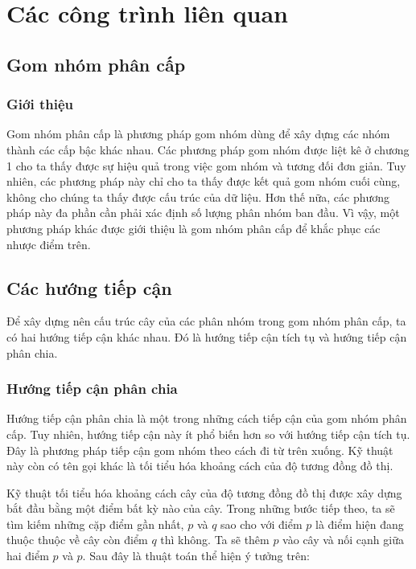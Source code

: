 \chapter{Các công trình liên quan}
\label{Chapter2}

\section{Gom nhóm phân cấp}
\subsection{Giới thiệu}
Gom nhóm phân cấp là phương pháp gom nhóm dùng để xây dựng các nhóm thành các cấp bậc khác nhau.
Các phương pháp gom nhóm được liệt kê ở chương 1 cho ta thấy được sự hiệu quả trong việc gom nhóm và tương đối đơn giản.
Tuy nhiên, các phương pháp này chỉ cho ta thấy được kết quả gom nhóm cuối cùng, không cho chúng ta thấy được cấu trúc của dữ liệu.
Hơn thế nữa, các phương pháp này đa phần cần phải xác định số lượng phân nhóm ban đầu.
Vì vậy, một phương pháp khác được giới thiệu là gom nhóm phân cấp để khắc phục các nhược điểm trên.

\section{Các hướng tiếp cận}
Để xây dựng nên cấu trúc cây của các phân nhóm trong gom nhóm phân cấp, ta có hai hướng tiếp cận khác nhau. Đó là hướng tiếp cận tích tụ và hướng tiếp cận phân chia.

\subsection{Hướng tiếp cận phân chia}
Hướng tiếp cận phân chia là một trong những cách tiếp cận của gom nhóm phân cấp.
Tuy nhiên, hướng tiếp cận này ít phổ biến hơn so với hướng tiếp cận tích tụ.
Đây là phương pháp tiếp cận gom nhóm theo cách đi từ trên xuống.
Kỹ thuật này còn có tên gọi khác là tối tiểu hóa khoảng cách của độ tương đồng đồ thị.

Kỹ thuật tối tiểu hóa khoảng cách cây của độ tương đồng đồ thị được xây dựng bắt đầu bằng một điểm bất kỳ nào của cây.
Trong những bước tiếp theo, ta sẽ tìm kiếm những cặp điểm gần nhất, $p$ và $q$ sao cho với điểm $p$ là điểm hiện đang thuộc thuộc về cây còn điểm $q$ thì không.
Ta sẽ thêm $p$ vào cây và nối cạnh giữa hai điểm $p$ và $p$.
Sau đây là thuật toán thể hiện ý tưởng trên:

